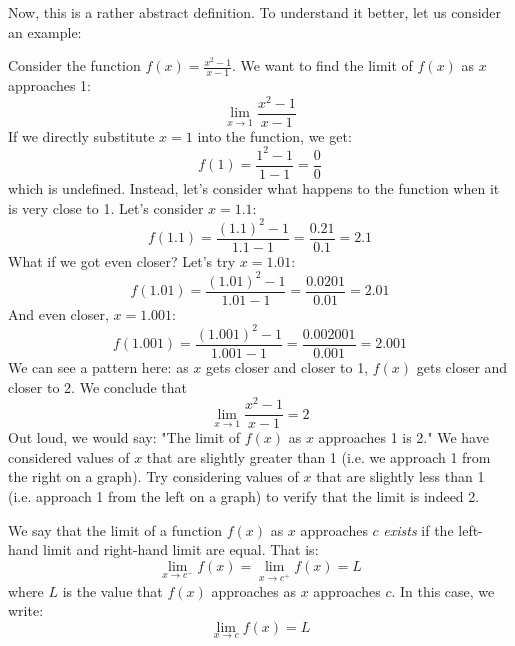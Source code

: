 Now, this is a rather abstract definition. To understand it better, let us consider an example:
\begin{eg}
    Consider the function $f(x) = \frac{x^2 - 1}{x - 1}$. We want to find the limit of $f(x)$ as $x$ approaches 1:
    \begin{equation*}
        \lim_{x \to 1} \frac{x^2 - 1}{x - 1}
    \end{equation*}
    If we directly substitute $x = 1$ into the function, we get:
    \begin{equation*}
        f(1) = \frac{1^2 - 1}{1 - 1} = \frac{0}{0}
    \end{equation*}
    which is undefined. Instead, let's consider what happens to the function when it is very close to 1.
    Let's consider $x=1.1$:
    \begin{equation*}
        f(1.1) = \frac{(1.1)^2 - 1}{1.1 - 1} = \frac{0.21}{0.1} = 2.1
    \end{equation*}
    What if we got even closer? Let's try $x=1.01$:
    \begin{equation*}
        f(1.01) = \frac{(1.01)^2 - 1}{1.01 - 1} = \frac{0.0201}{0.01} = 2.01
    \end{equation*}
    And even closer, $x=1.001$:
    \begin{equation*}
        f(1.001) = \frac{(1.001)^2 - 1}{1.001 - 1} = \frac{0.002001}{0.001} = 2.001
    \end{equation*}
    We can see a pattern here: as $x$ gets closer and closer to 1, $f(x)$ gets closer and closer to 2. We conclude that 
    \begin{equation*}
        \lim_{x \to 1} \frac{x^2 - 1}{x - 1} = 2
    \end{equation*}
    Out loud, we would say: "The limit of $f(x)$ as $x$ approaches 1 is 2."
    We have considered values of $x$ that are slightly greater than 1 (i.e. we approach 1 from the right on a graph). 
    Try considering values of $x$ that are slightly less than 1 (i.e. approach 1 from the left on a graph) to verify that the limit is indeed 2.
\end{eg}

\begin{definition}
    We say that the limit of a function $f(x)$ as $x$ approaches $c$ \textit{exists} if the left-hand limit
    and right-hand limit are equal. That is:
    \begin{equation*}
        \lim_{x \to c^-} f(x) = \lim_{x \to c^+} f(x) = L
    \end{equation*}
    where $L$ is the value that $f(x)$ approaches as $x$ approaches $c$. In this case, we write:
    \begin{equation*}
        \lim_{x \to c} f(x) = L
    \end{equation*}
\end{definition}


